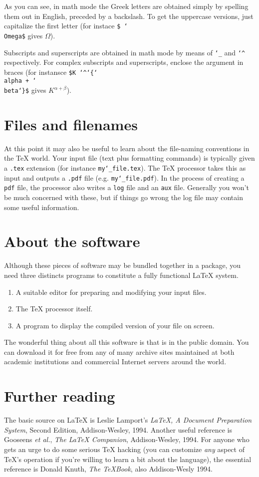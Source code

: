 \documentclass[12pt]{article}
\begin{document}
As you can see, in math mode the Greek letters are obtained simply by
spelling them out in English, preceded by a backslash. To get the
uppercase versions, just capitalize the first letter (for instace {\tt\$%
\char`\\Omega\$} gives $\Omega$).

Subscripts and superscripts are obtained in math mode by means of
{\tt\char`\_} and {\tt\char`\^} respectively. For complex subscripts and
superscripts, enclose the argument in braces (for instansce {\tt\$K%
\char`\^\char`\{\char`\\alpha + \char`\\beta\char`\}\$} gives
$K^{\alpha + \beta}$).
\section{Files and filenames}
\noindent
At this point it may also be useful to learn about the file-naming
conventions in the \TeX{} world. Your input file (text plus formatting
commands) is typically given a {\tt .tex} extension (for instance
{\tt my\char`\_file.tex}). The \TeX{} processor takes this as input and
outputs a {\tt .pdf} file (e.g. {\tt my\char`\_file.pdf}). In the process
of creating a {\tt pdf} file, the processor also writes a {\tt log} file
and an {\tt aux} file. Generally you won't be much concerned with these,
but if things go wrong the log file may contain some useful information.
\section{About the software}
\noindent
Although these pieces of software may be bundled together in a package, you
need three distincts programs to constitute a fully functional \LaTeX{}
system.

\begin{enumerate}
\item A suitable editor for preparing and modifying your input files.
\item The \TeX{} processor itself.
\item A program to display the compiled version of your file on screen.
\end{enumerate}

The wonderful thing about all this software is that is in the public
domain. You can download it for free from any of many archive sites
maintained at both academic institutions and commercial Internet servers
around the world.
\section*{Further reading}
\noindent
The basic source on \LaTeX{} is Leslie Lamport's {\it \LaTeX{}, A Document
Preparation System}, Second Edition, Addison-Wesley, 1994. Another useful
reference is Gooseens {\it et al.}, {\it The \LaTeX{} Companion},
Addison-Wesley, 1994. For anyone who gets an urge to do some serious
\TeX{} hacking (you can customize \emph{any} aspect of \TeX{}'s operation
if you're willing to learn a bit about the language), the essential
reference is Donald Knuth, {\it The \TeX{}Book}, also Addison-Wesly 1994.
\end{document}
